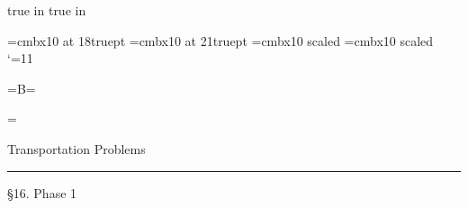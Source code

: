 
 true in
 true in

\def\blackbox{\vrule height 1.2ex width 1.0ex depth -.2ex}

  

\font\ch=cmbx10 at 18truept
\font\chtitle=cmbx10 at 21truept
\font\fourteenbf=cmbx10 scaled
\font\twelvebf=cmbx10 scaled
\catcode`\@=11
\def\m@th{\mathsurround=0pt }


\def\matriz#1{\,\vcenter{\normabaselines\m@th
\ialign{\hfil$##$\hfil&&\quad\hfil$##$\hfil\crcr
\mathstrut\crcr\noalign{\kern-\baselineskip}
#1\crcr\mathstrut\crcr\noalign{\kern-\baselineskip}}}\,}

 
\newdimen\p@renwd{}=\hbox{\tenex B}\p@renwd= 
\def\rowtab#1{\begingroup \m@th\setbox0=\vbox{\def\cr{\crcr\noalign{\kern2pt\global\let\cr=\endline}}
\ialign{$##$\hfil\kern2pt\kern\p@renwd&\thinspace\hfil$##$\hfil
&&\quad\hfil$##$\hfil\crcr
\omit\strut\hfil\crcr\noalign{\kern-\baselineskip}
#1\crcr\omit\strut\cr}}
\setbox2=\vbox{\unvcopy0 \global\setbox1=\lastbox}
\setbox2=\hbox{\unhbox1 \unskip \global\setbox1=\lastbox}
\setbox2=\hbox{$\kern\wd1\kern-\p@renwd \left [ \kern-\wd1
\global\setbox1=\vbox{\box1\kern2pt}
\vcenter{\kern-\ht1 \unvbox0 \kern-\baselineskip} \,\right]$}
\;\vbox{\kern\ht1\box2}\endgroup}

\def\bull{\vrule height .9ex width .9ex depth -.05ex }

 
\headline={\ifnum{} \else\ifodd\pageno\rightheadline\else \leftheadline\fi\fi}
 
\def\rightheadline{\tenrm\hfil{\it\S  16. Phase 1}\quad {\bf\folio}}
\def\leftheadline{\tenrm{\bf\folio}\quad{\it Chapter 6  Transportation Problems} \hfil}
\baselineskip

 \bigskip
 \bigskip
 \bigskip
\noindent
{} {}
\bigskip
 \bigskip
\noindent 
{\chtitle Transportation Problems}
 \medskip
\hrule
 \bigskip
\bigskip

\noindent
{\twelvebf   \S  16. Phase 1}

